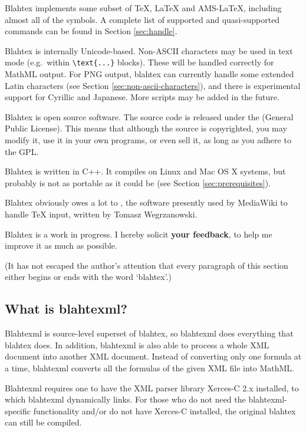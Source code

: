 \documentclass{article}
\newcommand{\texcommand}[1]{\textbackslash{}#1}
\begin{document}
Blahtex implements some subset of \TeX{}, \LaTeX{} and AMS-\LaTeX{}, including almost all of the symbols. A complete list of supported and quasi-supported commands can be found in Section \ref{sec:handle}.

Blahtex is internally Unicode-based. Non-ASCII characters may be used in text mode (e.g.~within \texttt{\texcommand{text}\{...\}} blocks). These will be handled correctly for MathML output. For PNG output, blahtex can currently handle some extended Latin characters (see Section \ref{sec:non-ascii-characters}), and there is experimental support for Cyrillic and Japanese. More scripts may be added in the future.

Blahtex is open source software. The source code is released under the  (General Public License). This means that although the source is copyrighted, you may modify it, use it in your own programs, or even sell it, as long as you adhere to the GPL.

Blahtex is written in C++. It compiles on Linux and Mac OS X systems, but probably is not as portable as it could be (see Section \ref{sec:prerequisites}).

Blahtex obviously owes a lot to , the software presently used by MediaWiki to handle \TeX{} input, written by Tomasz Wegrzanowski.

Blahtex is a work in progress. I hereby solicit {\bf your feedback}, to help me improve it as much as possible.

(It has not escaped the author's attention that every paragraph of this section either begins or ends with the word `blahtex'.)

\subsection{What is blahtexml?}

Blahtexml is source-level superset of blahtex, so blahtexml does everything that blahtex does. In addition, blahtexml is also able to process a whole XML document into another XML document. Instead of converting only one formula at a time, blahtexml converts all the formulas of the given XML file into MathML.

Blahtexml requires one to have the XML parser library Xerces-C 2.x installed, to which blahtexml dynamically links. For those who do not need the blahtexml-specific functionality and/or do not have Xerces-C installed, the original blahtex can still be compiled.
\end{document}
